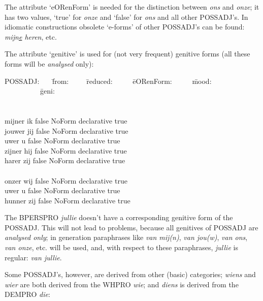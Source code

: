 The attribute `eORenForm' is needed for the distinction between {\em ons} and 
{\em onze}; it has two values, `true' for {\em onze} and `false' for {\em ons}
and all other POSSADJ's. In idiomatic constructions obsolete `e-forms' of 
other POSSADJ's can be found: {\em mijn\underline{e} heren}, etc.

The attribute `genitive' is used for (not very frequent) genitive forms
(all these forms will be {\em analysed} only):

\begin{tabbing}
POSSADJ: \ \ \  \= from:\ \ \ \ \  \= reduced: \ \ \ \ \  \= eORenForm: 
\ \ \ \ \  \= mood:  \ \ \ \ \ \ \ \ \ \    \= geni: \\
         \>       \>          \>            \>           \>       \\
         \>       \>          \>            \>        \>       \\
mijner  \> ik    \> false    \> NoForm \> declarative  \> true \\
jouwer  \> jij   \> false    \> NoForm \> declarative  \> true \\
uwer    \> u     \> false    \> NoForm \> declarative  \> true \\
zijner  \> hij   \> false    \> NoForm \> declarative  \> true \\
harer   \> zij   \> false    \> NoForm \> declarative  \> true \\
        \>       \>          \>        \>              \>      \\
onzer   \> wij   \> false    \> NoForm \> declarative  \> true \\
uwer    \> u     \> false    \> NoForm \> declarative  \> true \\
hunner  \> zij   \> false    \> NoForm \> declarative  \> true \\
\end{tabbing}

The BPERSPRO {\em jullie} doesn't have a corresponding genitive form of
the POSSADJ. This will not lead to problems, because all genitives of
POSSADJ are {\em analysed only}; in generation paraphrases like 
{\em van mij(n)}, {\em van jou(w)}, {\em van ons}, {\em van onze}, etc. will 
be used, and, with respect to these paraphrases, {\em jullie} is regular: 
{\em van jullie}.

Some POSSADJ's, however, are derived from other (basic) categories;
{\em wiens} and {\em wier} are both derived from the WHPRO {\em wie}; and
 {\em diens} is derived from the DEMPRO {\em die}:

